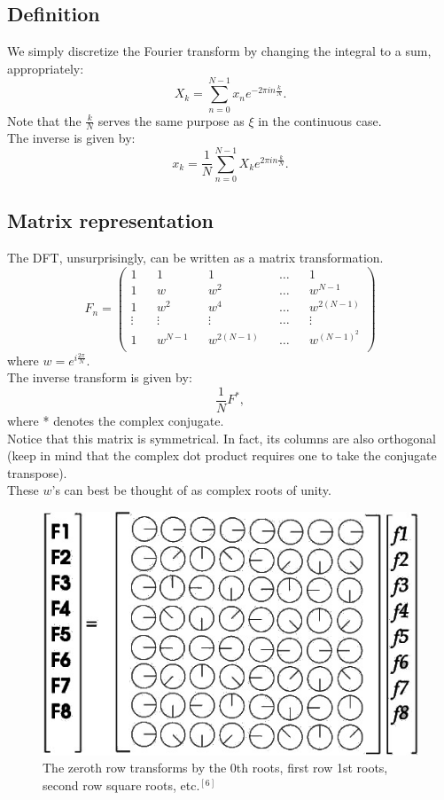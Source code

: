 \documentclass[11pt]{article}
\begin{document}
\subsection{Definition}
We simply discretize the Fourier transform by changing the integral to a sum, appropriately:
$$X_k=\sum_{n=0}^{N-1}x_n e^{-2\pi i n \frac{k}{N}}.$$
Note that the $\frac{k}{N}$ serves the same purpose as $\xi$ in the continuous case.\\
The inverse is given by:
$$ x_k = \frac{1}{N}\sum_{n=0}^{N-1}X_k e^{2\pi i n \frac{k}{N}}.$$
\subsection{Matrix representation}
The DFT, unsurprisingly, can be written as a matrix transformation.
$$
 F_n=\begin{pmatrix}
  1 && 1 && 1 && \dots && 1 \\
  1 && w && w^2 && \dots && w^{N-1}\\
  1 && w^2 && w^4 && \dots && w^{2(N-1)}\\
  \vdots && \vdots && \vdots && \dots &&\vdots \\
  1 && w^{N-1} && w^{2(N-1)} && \dots && w^{(N-1)^2} \\
 \end{pmatrix}$$
where $w=e^{i \frac{2\pi}{N}}$.\\
The inverse transform is given by:
$$ \frac{1}{N}F^*,$$ where * denotes the complex conjugate.\\
Notice that this matrix is symmetrical. In fact, its columns are also orthogonal (keep in mind that the complex dot product requires one to take the conjugate transpose).\\
These $w$'s can best be thought of as complex roots of unity.\\
\begin{figure}[h]
    \centering
    \includegraphics[scale=.45]{DFT_vis.jpg}
    \caption{The zeroth row transforms by the 0th roots, first row 1st roots, second row square roots, etc$.^{[6]}$}
\end{figure}
\end{document}
